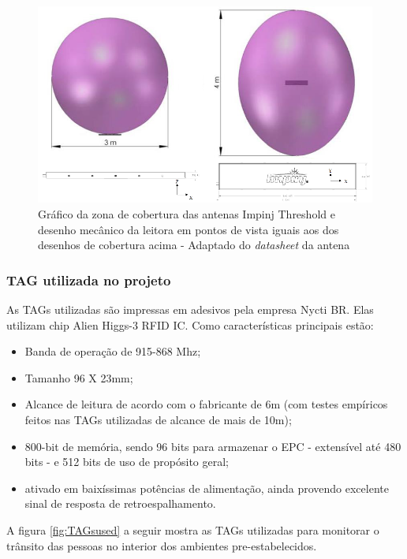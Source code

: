   \begin{figure}[H]
    \centering
    \includegraphics[width=0.6\linewidth]{figs/Metodologia/impinj_antenna_coverage.png}
    \caption{Gráfico da zona de cobertura das antenas Impinj Threshold e desenho mecânico da leitora em pontos de vista iguais aos dos desenhos de cobertura acima - Adaptado do \textit{datasheet} da antena \cite{AntenaThresholdDatasheet}}
    \label{fig:AntenaThresholdCobertura}
\end{figure}

\subsubsection{TAG utilizada no projeto}

As TAGs utilizadas são impressas em adesivos pela empresa Nycti BR. Elas utilizam chip Alien Higgs-3 RFID IC. Como características principais estão:

\begin{itemize}
    \item Banda de operação de 915-868 Mhz;
    \item Tamanho 96 X 23mm;
    \item Alcance de leitura de acordo com o fabricante de 6m (com testes empíricos feitos nas TAGs utilizadas de alcance de mais de 10m);
    \item 800-bit de memória, sendo 96 bits para armazenar o EPC - extensível até 480 bits - e 512 bits de uso de propósito geral; \cite{AlienHiggs3}
    \item ativado em baixíssimas potências de alimentação, ainda provendo excelente sinal de resposta de retroespalhamento. \cite{AlienHiggs3}
\end{itemize}

A figura \ref{fig:TAGsused} a seguir mostra as TAGs utilizadas para monitorar o trânsito das pessoas no interior dos ambientes pre-estabelecidos.

